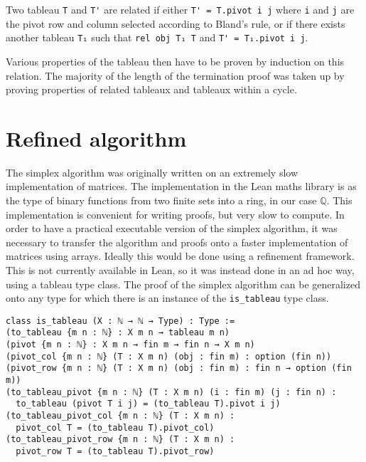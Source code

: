 \documentclass[11pt]{article} %
\begin{document}
Two tableau \lstinline|T| and \lstinline|T'| are related if either \lstinline|T' = T.pivot i j| where \lstinline|i| and \lstinline|j| are the pivot row and column selected according to Bland's rule, or if there exists another tableau \lstinline|T₁| such that \lstinline|rel obj T₁ T| and \lstinline|T' = T₁.pivot i j|.

Various properties of the tableau then have to be proven by induction on this relation. The majority of the length of the termination proof was taken up by proving properties of related tableaux and tableaux within a cycle.

\section{Refined algorithm}

The simplex algorithm was originally written on an extremely slow implementation of matrices. The implementation in the Lean maths library  is as the type of binary functions from two finite sets into a ring, in our case $\mathbb{Q}$. This implementation is convenient for writing proofs, but very slow to compute. In order to have a practical executable version of the simplex algorithm, it was necessary to transfer the algorithm and proofs onto a faster implementation of matrices using arrays. Ideally this would be done using a refinement framework.  This is not currently available in Lean, so it was instead done in an ad hoc way, using a tableau type class. The proof of the simplex algorithm can be generalized onto any type for which there is an instance of the \lstinline|is_tableau| type class.

\begin{lstlisting}
class is_tableau (X : ℕ → ℕ → Type) : Type :=
(to_tableau {m n : ℕ} : X m n → tableau m n)
(pivot {m n : ℕ} : X m n → fin m → fin n → X m n)
(pivot_col {m n : ℕ} (T : X m n) (obj : fin m) : option (fin n))
(pivot_row {m n : ℕ} (T : X m n) (obj : fin m) : fin n → option (fin m))
(to_tableau_pivot {m n : ℕ} (T : X m n) (i : fin m) (j : fin n) :
  to_tableau (pivot T i j) = (to_tableau T).pivot i j)
(to_tableau_pivot_col {m n : ℕ} (T : X m n) :
  pivot_col T = (to_tableau T).pivot_col)
(to_tableau_pivot_row {m n : ℕ} (T : X m n) :
  pivot_row T = (to_tableau T).pivot_row)
\end{lstlisting}
\end{document}
